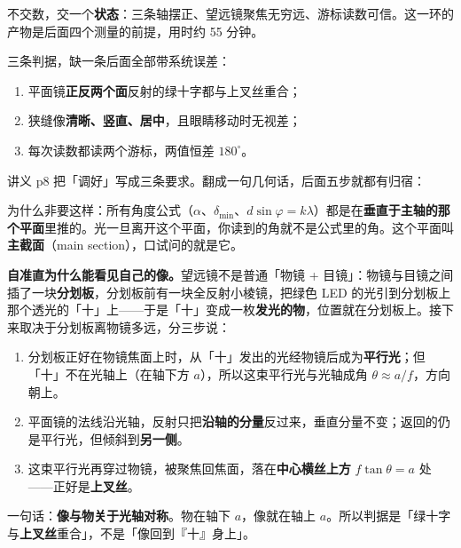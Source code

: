 

不交数，交一个\textbf{状态}：三条轴摆正、望远镜聚焦无穷远、游标读数可信。这一环的产物是后面四个测量的前提，用时约 55 分钟。

三条判据，缺一条后面全部带系统误差：
\begin{enumerate}[label=\textbf{(\arabic*)}]
\item 平面镜\textbf{正反两个面}反射的绿十字都与上叉丝重合；
\item 狭缝像\textbf{清晰、竖直、居中}，且眼睛移动时无视差；
\item 每次读数都读两个游标，两值恒差 $180^{\circ}$。
\end{enumerate}


讲义 p8 把「调好」写成三条要求。翻成一句几何话，后面五步就都有归宿：


为什么非要这样：所有角度公式（$\alpha$、$\delta_{\min}$、$d\sin\varphi=k\lambda$）都是在\textbf{垂直于主轴的那个平面}里推的。光一旦离开这个平面，你读到的角就不是公式里的角。这个平面叫\textbf{主截面}（main section），口试问的就是它。

\textbf{自准直为什么能看见自己的像。}望远镜不是普通「物镜 + 目镜」：物镜与目镜之间插了一块\textbf{分划板}，分划板前有一块全反射小棱镜，把绿色 LED 的光引到分划板上那个透光的「十」上——于是「十」变成一枚\textbf{发光的物}，位置就在分划板上。接下来取决于分划板离物镜多远，分三步说：

\begin{enumerate}[label=\textbf{(\arabic*)}]
\item 分划板正好在物镜焦面上时，从「十」发出的光经物镜后成为\textbf{平行光}；但「十」不在光轴上（在轴下方 $a$），所以这束平行光与光轴成角 $\theta\approx a/f$，方向朝上。
\item 平面镜的法线沿光轴，反射只把\textbf{沿轴的分量}反过来，垂直分量不变；返回的仍是平行光，但倾斜到\textbf{另一侧}。
\item 这束平行光再穿过物镜，被聚焦回焦面，落在\textbf{中心横丝上方} $f\tan\theta=a$ 处——正好是\textbf{上叉丝}。
\end{enumerate}

一句话：\textbf{像与物关于光轴对称}。物在轴下 $a$，像就在轴上 $a$。所以判据是「绿十字与\textbf{上叉丝}重合」，不是「像回到『十』身上」。

